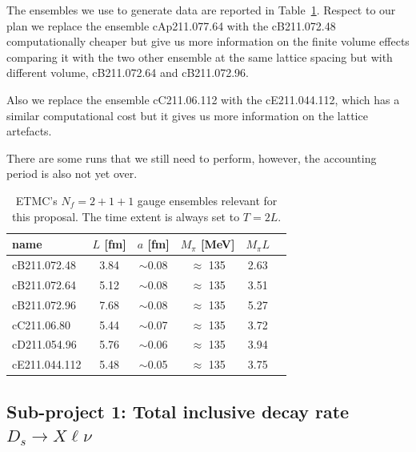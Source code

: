 \documentclass [a4paper, 11pt]{article}
\begin{document}
The ensembles we use to generate data are reported in Table~\ref{tab:ensembles}.
Respect to our plan we replace the ensemble cAp211.077.64 with the cB211.072.48
computationally cheaper but give us more information on the finite volume effects
comparing it with the two other ensemble at the same lattice spacing but with different volume,
cB211.072.64 and cB211.072.96.

Also we replace the ensemble cC211.06.112 with the cE211.044.112, which has a similar
computational cost but it gives us more information on the lattice artefacts.

There are some runs that we still need to perform, however, the
accounting period is also not yet over.


\begin{table}[h]
	\centering %
	\begin{tabular}{lccccr} %
		\hline
		name          & $L$ [fm]      & $a$
		[fm]          & $M_\pi$ [MeV] & $M_\pi L$                         \\
		\hline
		\hline
		cB211.072.48  & 3.84          & $\sim$0.08 & $\approx$ 135 & 2.63 \\
		cB211.072.64  & 5.12          & $\sim$0.08 & $\approx$ 135 & 3.51 \\
		cB211.072.96  & 7.68          & $\sim$0.08 & $\approx$ 135 & 5.27 \\
		\hline
		cC211.06.80   & 5.44          & $\sim$0.07 & $\approx$ 135 & 3.72 \\
		\hline
		cD211.054.96  & 5.76          & $\sim$0.06 & $\approx$ 135 & 3.94 \\
		\hline
		cE211.044.112 & 5.48          & $\sim$0.05 & $\approx$ 135 & 3.75 \\
		\hline
	\end{tabular}
	\caption{ETMC's $N_f=2+1+1$ gauge ensembles relevant for this
		proposal. The time extent is always set to $T=2L$.}
	\label{tab:ensembles}
\end{table}

\subsection{Sub-project 1: Total inclusive decay rate $D_s \to X\ell\nu$}
\end{document}
